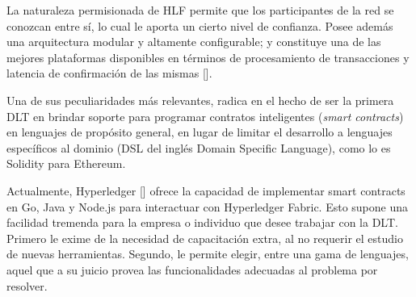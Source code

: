La naturaleza permisionada de HLF permite que los participantes de la red se conozcan entre s\'i, lo cual le aporta un cierto nivel de confianza.
Posee adem\'as una arquitectura modular y altamente configurable; y constituye una de las mejores plataformas disponibles en t\'erminos de procesamiento de transacciones y latencia de confirmaci\'on de las mismas [\cite{hlfdocs}]. %

Una de sus peculiaridades m\'as relevantes, radica en el hecho de ser la primera DLT en brindar soporte para programar contratos inteligentes (\emph{smart contracts}) en lenguajes de prop\'osito general, en lugar de limitar el desarrollo a lenguajes espec\'ificos al dominio (DSL del ingl\'es Domain Specific Language), como lo es Solidity para Ethereum. %


Actualmente, Hyperledger [\cite{hyperledgerorg}] ofrece la capacidad de implementar smart contracts en Go, Java y Node.js para interactuar con Hyperledger Fabric. Esto supone una facilidad tremenda para la empresa o individuo que desee trabajar con la DLT. Primero le exime de la necesidad de capacitaci\'on extra, al no requerir el estudio de nuevas herramientas. Segundo, le permite elegir, entre una gama de lenguajes, aquel que a su juicio provea las funcionalidades adecuadas al problema por resolver.%


